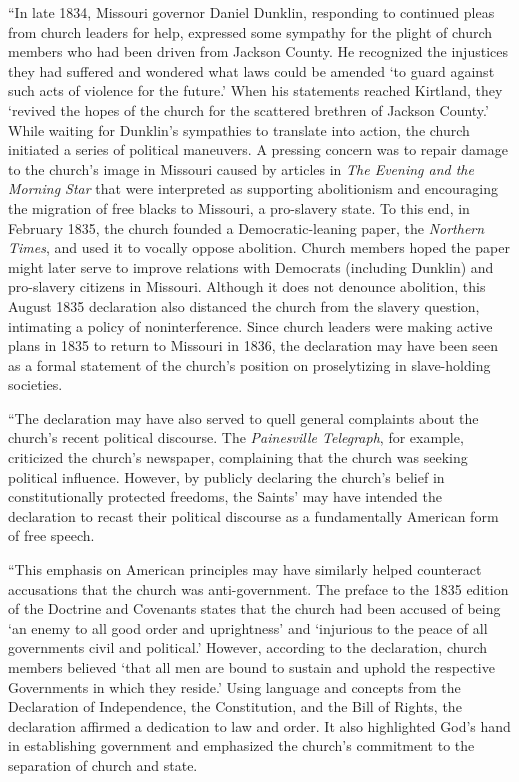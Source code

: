 			``In late 1834, Missouri governor Daniel Dunklin, responding to continued pleas from church leaders for help, expressed some sympathy for the plight of church members who had been driven from Jackson County. He recognized the injustices they had suffered and wondered what laws could be amended `to guard against such acts of violence for the future.' When his statements reached Kirtland, they `revived the hopes of the church for the scattered brethren of Jackson County.' While waiting for Dunklin's sympathies to translate into action, the church initiated a series of political maneuvers. A pressing concern was to repair damage to the church's image in Missouri caused by articles in \textit{The Evening and the Morning Star} that were interpreted as supporting abolitionism and encouraging the migration of free blacks to Missouri, a pro-slavery state. To this end, in February 1835, the church founded a Democratic-leaning paper, the \textit{Northern Times}, and used it to vocally oppose abolition. Church members hoped the paper might later serve to improve relations with Democrats (including Dunklin) and pro-slavery citizens in Missouri. Although it does not denounce abolition, this August 1835 declaration also distanced the church from the slavery question, intimating a policy of noninterference. Since church leaders were making active plans in 1835 to return to Missouri in 1836, the declaration may have been seen as a formal statement of the church's position on proselytizing in slave-holding societies.

			``The declaration may have also served to quell general complaints about the church's recent political discourse. The \textit{Painesville Telegraph}, for example, criticized the church's newspaper, complaining that the church was seeking political influence. However, by publicly declaring the church's belief in constitutionally protected freedoms, the Saints' may have intended the declaration to recast their political discourse as a fundamentally American form of free speech.

			``This emphasis on American principles may have similarly helped counteract accusations that the church was anti-government. The preface to the 1835 edition of the Doctrine and Covenants states that the church had been accused of being `an enemy to all good order and uprightness' and `injurious to the peace of all governments civil and political.' However, according to the declaration, church members believed `that all men are bound to sustain and uphold the respective Governments in which they reside.' Using language and concepts from the Declaration of Independence, the Constitution, and the Bill of Rights, the declaration affirmed a dedication to law and order. It also highlighted God's hand in establishing government and emphasized the church's commitment to the separation of church and state.

